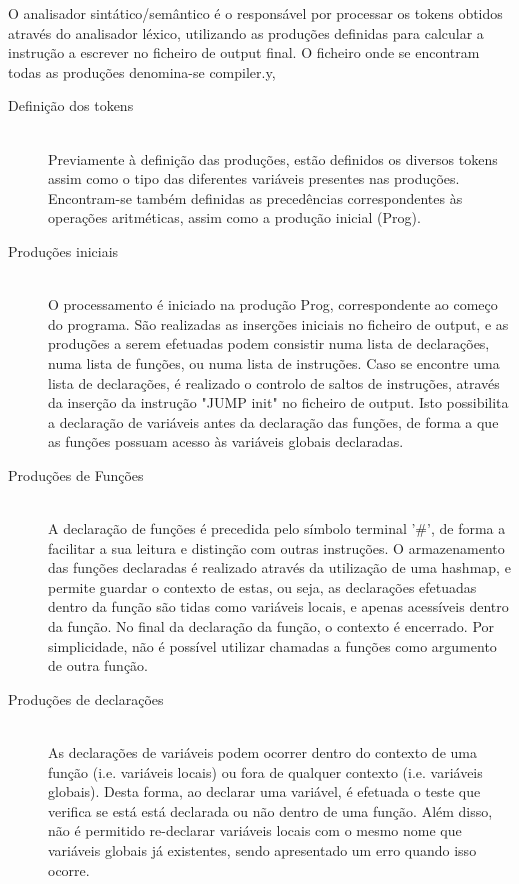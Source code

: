 \documentclass[a4paper,10pt]{report}
\begin{document}
O analisador sintático/semântico é o responsável por processar os tokens obtidos através do analisador léxico, 
utilizando as produções definidas para calcular a instrução a escrever no ficheiro de output final. O ficheiro onde se encontram todas as 
produções denomina-se compiler.y, 

\begin{description}

\item[Definição dos tokens] \hfill \\

Previamente à definição das produções, estão definidos os diversos tokens assim como o tipo das diferentes variáveis presentes nas produções. Encontram-se também definidas as precedências correspondentes às operações aritméticas, assim como a produção inicial (Prog).  

\item[Produções iniciais] \hfill \\

O processamento é iniciado na produção Prog, correspondente ao começo do programa. São realizadas as inserções iniciais no ficheiro de output, e as produções a serem efetuadas podem consistir numa lista de declarações, numa lista de funções, ou numa lista de instruções. Caso se encontre uma lista de declarações, é realizado o controlo de saltos de instruções, através da inserção da instrução "JUMP init" no ficheiro de output. Isto possibilita a declaração de variáveis antes da declaração das funções, de forma a que as funções possuam acesso às variáveis globais declaradas.  

\item[Produções de Funções] \hfill \\

A declaração de funções é precedida pelo símbolo terminal '\#', de forma a facilitar a sua leitura e distinção com outras instruções. O armazenamento das funções declaradas é realizado através da utilização de uma hashmap, e permite guardar o contexto de estas, ou seja, as declarações efetuadas dentro da função são tidas como variáveis locais, e apenas acessíveis dentro da função. No final da declaração da função, o contexto é encerrado. Por simplicidade, não é possível utilizar chamadas a funções como argumento de outra função.

\item[Produções de declarações] \hfill \\

As declarações de variáveis podem ocorrer dentro do contexto de uma função (i.e. variáveis locais) ou fora de qualquer contexto (i.e. variáveis globais). Desta forma, ao declarar uma variável, é efetuada o teste que verifica se está está declarada ou não dentro de uma função. Além disso, não é permitido re-declarar variáveis locais com o mesmo nome que variáveis globais já existentes, sendo apresentado um erro quando isso ocorre.


\end{description}
\end{document}
